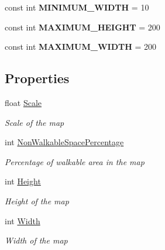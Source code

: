 \begin{DoxyCompactItemize}
\item 
\hypertarget{class_hel_project_1_1_game_world_1_1_map_1_1_h_map_ada746a4e165978121a6f3a85ae25c3ac}{}const int {\bfseries M\+I\+N\+I\+M\+U\+M\+\_\+\+W\+I\+D\+T\+H} = 10\label{class_hel_project_1_1_game_world_1_1_map_1_1_h_map_ada746a4e165978121a6f3a85ae25c3ac}

\item 
\hypertarget{class_hel_project_1_1_game_world_1_1_map_1_1_h_map_a48a95218ab4ed143b49f0cc510d7e43b}{}const int {\bfseries M\+A\+X\+I\+M\+U\+M\+\_\+\+H\+E\+I\+G\+H\+T} = 200\label{class_hel_project_1_1_game_world_1_1_map_1_1_h_map_a48a95218ab4ed143b49f0cc510d7e43b}

\item 
\hypertarget{class_hel_project_1_1_game_world_1_1_map_1_1_h_map_a312da821aed5e9718bc07f68494834a8}{}const int {\bfseries M\+A\+X\+I\+M\+U\+M\+\_\+\+W\+I\+D\+T\+H} = 200\label{class_hel_project_1_1_game_world_1_1_map_1_1_h_map_a312da821aed5e9718bc07f68494834a8}

\end{DoxyCompactItemize}
\subsection*{Properties}
\begin{DoxyCompactItemize}
\item 
float \hyperlink{class_hel_project_1_1_game_world_1_1_map_1_1_h_map_a023973ffc8b857d992378e235632021c}{Scale}
\begin{DoxyCompactList}\small\item\em Scale of the map \end{DoxyCompactList}\item 
int \hyperlink{class_hel_project_1_1_game_world_1_1_map_1_1_h_map_aa4a0c49d61c84b21d2a40745843b20df}{Non\+Walkable\+Space\+Percentage}
\begin{DoxyCompactList}\small\item\em Percentage of walkable area in the map \end{DoxyCompactList}\item 
int \hyperlink{class_hel_project_1_1_game_world_1_1_map_1_1_h_map_aeb6bb95a8fa7aebc3aaacc656ec70a76}{Height}
\begin{DoxyCompactList}\small\item\em Height of the map \end{DoxyCompactList}\item 
int \hyperlink{class_hel_project_1_1_game_world_1_1_map_1_1_h_map_aeb3db69a653089c32c2b61c7612bd106}{Width}
\begin{DoxyCompactList}\small\item\em Width of the map \end{DoxyCompactList}\end{DoxyCompactItemize}


